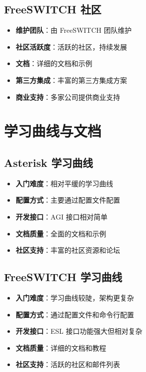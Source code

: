 \documentclass[12pt,UTF8]{ctexbook}
\begin{document}
\section{FreeSWITCH 社区}

\begin{itemize}
  \item \textbf{维护团队}：由 FreeSWITCH 团队维护
  \item \textbf{社区活跃度}：活跃的社区，持续发展
  \item \textbf{文档}：详细的文档和示例
  \item \textbf{第三方集成}：丰富的第三方集成方案
  \item \textbf{商业支持}：多家公司提供商业支持
\end{itemize}

\chapter{学习曲线与文档}
\section{Asterisk 学习曲线}

\begin{itemize}
  \item \textbf{入门难度}：相对平缓的学习曲线
  \item \textbf{配置方式}：主要通过配置文件配置
  \item \textbf{开发接口}：AGI 接口相对简单
  \item \textbf{文档质量}：全面的文档和示例
  \item \textbf{社区支持}：丰富的社区资源和论坛
\end{itemize}

\section{FreeSWITCH 学习曲线}

\begin{itemize}
  \item \textbf{入门难度}：学习曲线较陡，架构更复杂
  \item \textbf{配置方式}：通过配置文件和命令行配置
  \item \textbf{开发接口}：ESL 接口功能强大但相对复杂
  \item \textbf{文档质量}：详细的文档和教程
  \item \textbf{社区支持}：活跃的社区和邮件列表
\end{itemize}
\end{document}
